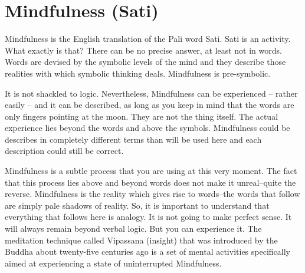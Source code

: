 \chapter{Mindfulness (Sati)}

Mindfulness is the English translation of the Pali word Sati. Sati is an
activity. What exactly is that? There can be no precise answer, at least not in
words. Words are devised by the symbolic levels of the mind and they describe
those realities with which symbolic thinking deals. Mindfulness is pre-symbolic.

It is not shackled to logic. Nevertheless, Mindfulness can be experienced --
rather easily -- and it can be described, as long as you keep in mind that the
words are only fingers pointing at the moon. They are not the thing itself. The
actual experience lies beyond the words and above the symbols. Mindfulness could
be describes in completely different terms than will be used here and each
description could still be correct.

Mindfulness is a subtle process that you are using at this very moment. The fact
that this process lies above and beyond words does not make it unreal--quite the
reverse. Mindfulness is the reality which gives rise to words--the words that
follow are simply pale shadows of reality. So, it is important to understand
that everything that follows here is analogy. It is not going to make perfect
sense. It will always remain beyond verbal logic. But you can experience it. The
meditation technique called Vipassana (insight) that was introduced by the
Buddha about twenty-five centuries ago is a set of mental activities
specifically aimed at experiencing a state of uninterrupted Mindfulness.

